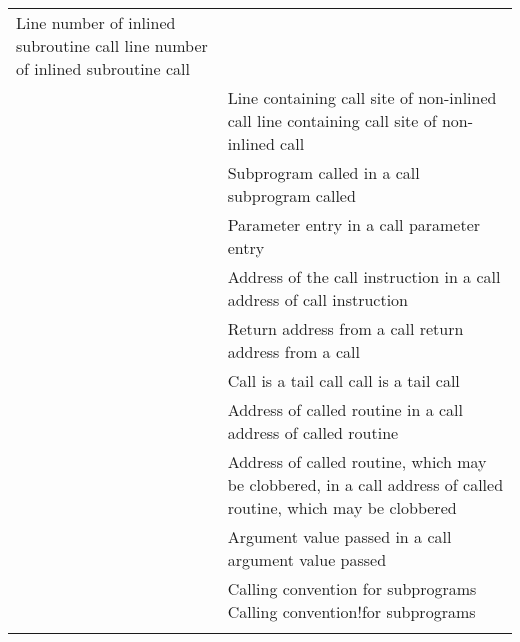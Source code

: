 \begin{longtable}{P{6.2cm}|P{8.5cm}}
           {Line number of inlined subroutine call}
           {line number of inlined subroutine call} \\
&
           {Line containing call site of non-inlined call}
           {line containing call site of non-inlined call} \\
\DWATcalloriginTARG{}
&
           {Subprogram called in a call}
           {subprogram called}
            \\
\DWATcallparameterTARG{}
&
           {Parameter entry in a call}
           {parameter entry}
            \\
\DWATcallpcTARG{}
&
           {Address of the call instruction in a call}
           {address of call instruction}
            \\
\DWATcallreturnpcTARG{}
&
           {Return address from a call}
           {return address from a call}
            \\
\DWATcalltailcallTARG{}
&
           {Call is a tail call}
           {call is a tail call}
            \\
\DWATcalltargetTARG{}
&
           {Address of called routine in a call}
           {address of called routine}
            \\
\DWATcalltargetclobberedTARG{}
&
           {Address of called routine, which may be clobbered, in a call}
           {address of called routine, which may be clobbered}
            \\
\DWATcallvalueTARG{}
&
           {Argument value passed in a call}
           {argument value passed}
            \\
\DWATcallingconventionTARG{}
&
           {Calling convention for subprograms}
           {Calling convention!for subprograms} \\
&

\end{longtable}
